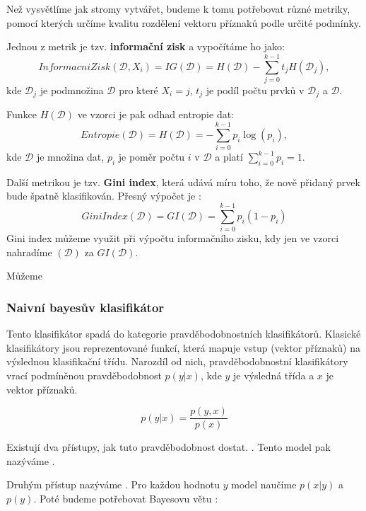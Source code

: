 Než vysvětlíme jak stromy vytvářet, budeme k tomu potřebovat různé metriky, pomocí kterých určíme kvalitu rozdělení vektoru příznaků podle určité podmínky.

Jednou z metrik je tzv. \textbf{informační zisk} a vypočítáme ho jako\cite{decisionTrees}:
\[
InformacniZisk(\mathcal{D},X_i) = IG(\mathcal{D}) = H(\mathcal{D}) - \sum^{k-1}_{j = 0} t_j  H(\mathcal{D}_j),
\]kde $\mathcal{D}_j$ je podmnožina $\mathcal{D}$ pro které $X_i = j$, $t_j$ je podíl počtu prvků v $\mathcal{D}_j$ a $\mathcal{D}$. 

Funkce $H(\mathcal{D})$ ve vzorci je pak odhad entropie dat:
\[
Entropie(\mathcal{D}) = H(\mathcal{D}) = - \sum^{k-1}_{i = 0} p_i  \log(p_i),
\]
kde $\mathcal{D}$ je množina dat, $p_i$ je  poměr počtu $i$ v $\mathcal{D}$ a platí $ \sum^{k-1}_{i = 0} p_i = 1$. 


Další metrikou je tzv. \textbf{Gini index}, která udává míru toho, že nově přidaný prvek bude špatně klasifikován. Přesný výpočet je \cite{vzd}:
\[
GiniIndex(\mathcal{D}) = GI(\mathcal{D}) = \sum^{k-1}_{i = 0} p_i  (1 - p_i) 
\]
Gini index můžeme využit při výpočtu informačního zisku, kdy jen ve vzorci nahradíme $(\mathcal{D})$ za  $GI(\mathcal{D})$.

Můžeme

\subsubsection{Naivní bayesův klasifikátor}
Tento klasifikátor spadá do kategorie pravděbodobnostních klasifikátorů. Klasické klasifikátory jsou reprezentované funkcí, která mapuje vstup (vektor příznaků) na výslednou klasifikační třídu. Narozdíl od nich, pravděbodobnostní klasifikátory vrací podmíněnou pravděbodobnost $p(y|x)$, kde $y$ je výsledná třída  a $x$ je vektor příznaků.

\begin{definition}
    $$ p(y|x) = \frac{p(y,x)}{p(x)} $$
    \end{definition}

Existují dva přístupy, jak tuto pravděbodobnost dostat. \cite{naiveBayes}  \cite*[překlad vlasntí]{naiveBayes}. Tento model pak nazýváme .

Druhým přístup nazýváme . Pro každou hodnotu $y$ model naučíme $p(x|y)$ a $p(y)$. Poté budeme potřebovat Bayesovu větu \cite{prob}:

